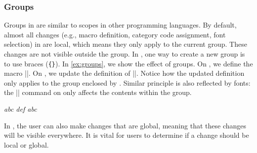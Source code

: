 \documentclass{ltugboat}
\begin{document}
\subsubsection{Groups}
Groups in \LT{} are similar to scopes in other programming languages.
By default, almost all changes (e.g., macro definition, category code assignment, font selection) in \LT{} are local, which means they only apply to the current group.
These changes are not visible outside the group.
In \LT{}, one way to create a new group is to use braces (\verb|{}|).
In \cref{ex:groups}, we show the effect of groups.
On , we define the macro \inltex|\abc|.
On , we update the definition of \inltex|\abc|.
Notice how the updated definition only applies to the group enclosed by .
Similar principle is also reflected by fonts: the \inltex|\normalfont| command on  only affects the contents within the group.
\begin{latexsample}[examplelabel={ex:groups},exampletitle={Groups}]
\itshape
\def\abc{abc }%
\abc%
{%
  \normalfont%
  \def\abc{def }%
  \abc%
}%
\abc%
\end{latexsample}
\noindent In \LT{}, the user can also make changes that are global, meaning that these changes will be visible everywhere.
It is vital for \LT{} users to determine if a change should be local or global.


\end{document}
